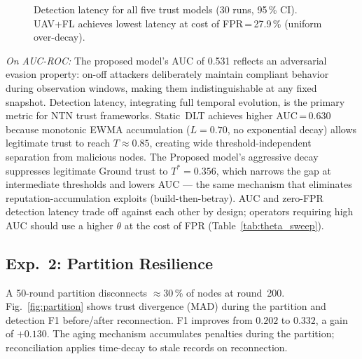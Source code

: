 \documentclass[journal,twoside,10pt]{IEEEtran}
\begin{document}
\begin{figure}[t]
\centering
{}
\caption{Detection latency for all five trust models (30 runs,
         95\,\% CI). UAV+FL achieves lowest latency at cost of
         FPR\,=\,27.9\,\% (uniform over-decay).}
\label{fig:detection}
\end{figure}

\textit{On AUC-ROC:} The proposed model's AUC of 0.531 reflects an
adversarial evasion property: on-off attackers deliberately maintain
compliant behavior during observation windows, making them
indistinguishable at any fixed snapshot.
Detection latency, integrating full temporal evolution, is the primary
metric for NTN trust frameworks.
Static~DLT achieves higher AUC\,=\,0.630 because monotonic EWMA
accumulation ($L\!=\!0.70$, no exponential decay) allows legitimate
trust to reach $T\!\approx\!0.85$, creating wide threshold-independent
separation from malicious nodes.
The Proposed model's aggressive decay suppresses legitimate Ground
trust to $T^*\!=\!0.356$, which narrows the gap at intermediate
thresholds and lowers AUC --- the same mechanism that eliminates
reputation-accumulation exploits (build-then-betray).
AUC and zero-FPR detection latency trade off against each other by
design; operators requiring high AUC should use a higher $\theta$
at the cost of FPR (Table~\ref{tab:theta_sweep}).

\subsection{Exp.~2: Partition Resilience}

A 50-round partition disconnects $\approx$30\,\% of nodes at round~200.
Fig.~\ref{fig:partition} shows trust divergence (MAD) during the
partition and detection F1 before/after reconnection.
F1 improves from $0.202$ to $0.332$, a gain of \textbf{$+0.130$}.
The aging mechanism accumulates penalties during the partition;
reconciliation applies time-decay to stale records on reconnection.
\end{document}
